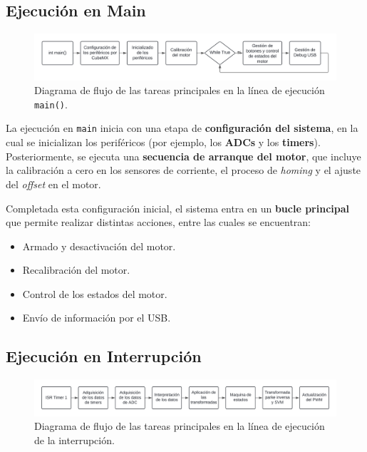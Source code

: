 \documentclass[11pt]{report}
\begin{document}
\subsection{Ejecución en Main}

\begin{figure}[ht]
	\centering
	\includegraphics[width=\textwidth]{imagenes/Diagramas/linea main.png}
	\caption{Diagrama de flujo de las tareas principales en la línea de ejecución \texttt{main()}.}
	\label{fig:linea_ejecucion_main}
\end{figure}
\FloatBarrier

La ejecución en \texttt{main} inicia con una etapa de \textbf{configuración del sistema}, en la cual se inicializan los periféricos (por ejemplo, los \textbf{ADCs} y los \textbf{timers}). Posteriormente, se ejecuta una \textbf{secuencia de arranque del motor}, que incluye la calibración a cero en los sensores de corriente, el proceso de \emph{homing} y el ajuste del \emph{offset} en el motor.

\newpage
Completada esta configuración inicial, el sistema entra en un \textbf{bucle principal} que permite realizar distintas acciones, entre las cuales se encuentran:
\begin{itemize}
	\item Armado y desactivación del motor.
	\item Recalibración del motor.
	\item Control de los estados del motor.
	\item Envío de información por el USB.
\end{itemize}

\subsection{Ejecución en Interrupción}

\begin{figure}[ht]
	\centering
	\includegraphics[width=\textwidth]{imagenes/Diagramas/linea timer.png}
	\caption{Diagrama de flujo de las tareas principales en la línea de ejecución de la interrupción.}
	\label{fig:linea_ejecucion_interrupcion}
\end{figure}
\FloatBarrier
\end{document}
